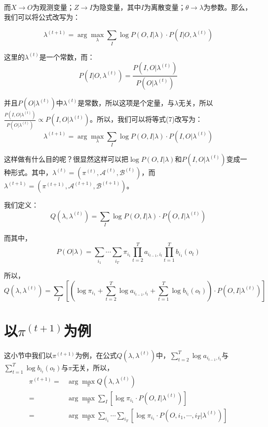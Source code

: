 \documentclass[a4paper]{article}
\begin{document}
而$X\rightarrow O$为观测变量；$Z\rightarrow I$为隐变量，其中$I$为离散变量；$\theta \rightarrow \lambda$为参数。那么，我们可以将公式改写为：

\begin{equation}
    \lambda^{(t+1)} = \arg\max_\lambda \sum_I \log P(O,I|\lambda)\cdot P(I|O,\lambda^{(t)}) 
\end{equation}

这里的$\lambda^{(t)}$是一个常数，而：
\begin{equation}
    P(I|O,\lambda^{(t)}) = \frac{P(I,O|\lambda^{(t)})}{P(O|\lambda^{(t)})}
\end{equation}

并且$P(O|\lambda^{(t)})$中$\lambda^{(t)}$是常数，所以这项是个定量，与$\lambda$无关，所以$\frac{P(I,O|\lambda^{(t)})}{P(O|\lambda^{(t)})} \propto P(I,O|\lambda^{(t)})$。所以，我们可以将等式(7)改写为：
\begin{equation}
    \lambda^{(t+1)} = \arg\max_\lambda \sum_I \log P(O,I|\lambda)\cdot P(I,O|\lambda^{(t)})
\end{equation}

这样做有什么目的呢？很显然这样可以把$\log P(O,I|\lambda)$和$P(I,O|\lambda^{(t)})$变成一种形式。其中，$\lambda^{(t)} = (\pi^{(t)}, \mathcal{A}^{(t)}, \mathcal{B}^{(t)})$，而$\lambda^{(t+1)} = (\pi^{(t+1)}, \mathcal{A}^{(t+1)}, \mathcal{B}^{(t+1)})$。

我们定义：
\begin{equation}
    Q(\lambda,\lambda^{(t)}) = \sum_I \log P(O,I|\lambda)\cdot P(O,I|\lambda^{(t)}) 
\end{equation}

而其中，
{\color{red}
\begin{equation}
    P(O|\lambda) =  \sum_{i_1}\cdots\sum_{i_T} \pi_{i_1} \prod_{t=2}^T a_{i_{t-1},i_{t}} \prod_{t=1}^T b_{i_1}(o_t)
\end{equation}
}

所以，
\begin{equation}
    Q(\lambda,\lambda^{(t)}) = \sum_I \left[ \left( \log \pi_{i_1} + \sum_{t=2}^T \log a_{i_{t-1},i_t} + \sum_{t=1}^T \log b_{i_t}(o_t) \right)\cdot P(O,I|\lambda^{(t)})  \right]
\end{equation}

\section{以$\pi^{(t+1)}$为例}
这小节中我们以$\pi^{(t+1)}$为例，在公式$Q(\lambda,\lambda^{(t)})$中，$\sum_{t=2}^T \log a_{i_{t-1},i_t}$与$\sum_{t=1}^T \log b_{i_t}(o_t)$与$\pi$无关，所以，
\begin{equation}
    \begin{split}
        \pi^{(t+1)} = & \arg\max_{\pi} Q(\lambda,\lambda^{(t)}) \\
        = & \arg\max_{\pi} \sum_I [\log \pi_{i_1} \cdot P(O,I|\lambda^{(t)})] \\
        = & \arg\max_{\pi} \sum_{i_1}\cdots \sum_{i_T}[\log \pi_{i_1} \cdot P(O,i_1,\cdots,i_T|\lambda^{(t)})]
    \end{split}
\end{equation}
\end{document}
